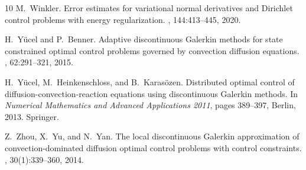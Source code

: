 \documentclass[a4paper,10pt]{article}
\numberwithin{theorem}{section}
\begin{document}
\begin{thebibliography}{10}
M.~Winkler.
\newblock Error estimates for variational normal derivatives and {D}irichlet
  control problems with energy regularization.
, 144:413--445, 2020.

H.~Y\"ucel and P.~Benner.
\newblock Adaptive discontinuous {G}alerkin methods for state constrained
  optimal control problems governed by convection diffusion equations.
, 62:291--321, 2015.

H.~Y\"ucel, M.~Heinkenschloss, and B.~Karas\"{o}zen.
\newblock Distributed optimal control of diffusion-convection-reaction
  equations using discontinuous {G}alerkin methods.
\newblock In {\em Numerical Mathematics and Advanced Applications 2011}, pages
  389--397, Berlin, 2013. Springer.

Z.~Zhou, X.~Yu, and N.~Yan.
\newblock The local discontinuous {G}alerkin approximation of
  convection-dominated diffusion optimal control problems with control
  constraints.
, 30(1):339--360,
  2014.

\end{thebibliography}
\end{document}
